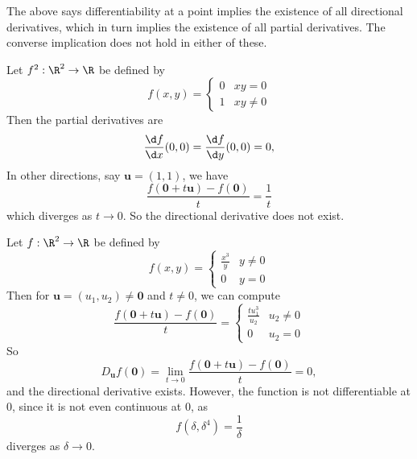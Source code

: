 \documentclass[a4paper]{article}
\begin{document}
The above says differentiability at a point implies the existence of all directional derivatives, which in turn implies the existence of all partial derivatives. The converse implication does not hold in either of these.
\begin{eg}
  Let $f^2: \R^2 \to \R$ be defined by
  \[
    f(x, y) =
    \begin{cases}
      0 & xy = 0\\
      1 & xy \not= 0
    \end{cases}
  \]
  Then the partial derivatives are
  \[
    \frac{\d f}{\d x} (0, 0) = \frac{\d f}{\d y} (0, 0) = 0,
  \]
  In other directions, say $\mathbf{u} = (1, 1)$, we have
  \[
    \frac{f(\mathbf{0} + t \mathbf{u}) - f(\mathbf{0})}{t} = \frac{1}{t}
  \]
  which diverges as $t \to 0$. So the directional derivative does not exist.
\end{eg}

\begin{eg}
  Let $f: \R^2 \to \R$ be defined by
  \[
    f(x, y) =
    \begin{cases}
      \frac{x^3}{y} & y \not= 0\\
      0 & y = 0
    \end{cases}
  \]
  Then for $\mathbf{u} = (u_1, u_2) \not= \mathbf{0}$ and $t \not= 0$, we can compute
  \[
    \frac{f(\mathbf{0} + t\mathbf{u}) - f(\mathbf{0})}{t} =
    \begin{cases}
      \frac{t u_1^3}{u_2} & u_2 \not= 0\\
      0 & u_2 = 0
    \end{cases}
  \]
  So
  \[
    D_{\mathbf{u} } f(\mathbf{0}) = \lim_{t\to 0} \frac{f(\mathbf{0} + t\mathbf{u}) - f(\mathbf{0})}{t} = 0,
  \]
  and the directional derivative exists. However, the function is not differentiable at $0$, since it is not even continuous at $0$, as
  \[
    f(\delta, \delta^4) = \frac{1}{\delta}
  \]
  diverges as $\delta \to 0$.
\end{eg}
\end{document}

